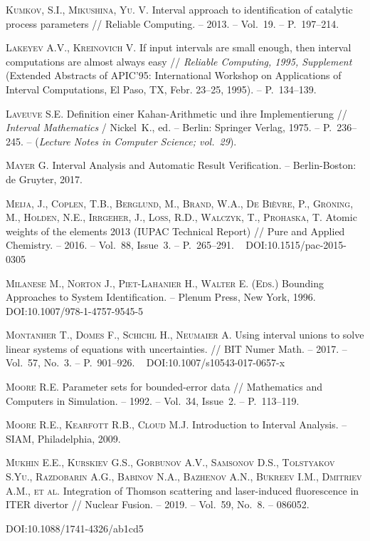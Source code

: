 \documentclass[a5paper,openany]{book}
\newcommand{\electronicbook}{}%
\newcommand{\doi}[1]{
    \ifdefined\electronicbook
        DOI:#1
    \fi}%
\begin{document}
\begin{thebibliography}{999}
\textsc{Kumkov, S.I., Mikushina, Yu. V.} Interval approach to identification 
of catalytic process parameters // Reliable Computing. -- 2013. -- Vol.~19. 
-- P.~197--214. 
  
\textsc{Lakeyev A.V., Kreinovich V.} If input intervals are small enough, then interval 
computations are almost always easy // \textsl{Reliable Computing, 1995, Supplement} 
(Extended Abstracts of APIC'95: International Workshop on Applications of Interval 
Computations, El Paso, TX, Febr. 23--25, 1995). -- P.~134--139. 
  
\textsc{Laveuve S.E.} Definition einer Kahan-Arithmetic und ihre Implementierung // 
\textsl{Interval Mathematics} / Nickel~K., ed. -- Berlin: Springer Verlag, 1975. -- 
P.~236--245. -- (\textsl{Lecture Notes in Computer Science; vol.~29}). 
  
\textsc{Mayer G.} Interval Analysis and Automatic Result Verification. -- Berlin-Boston: 
de Gruyter, 2017.  
  
\textsc{Meija, J., Coplen, T.B., Berglund, M., Brand, W.A., De Bièvre, P., 
Gröning, M., Holden, N.E., Irrgeher, J., Loss, R.D., Walczyk, T., Prohaska, T.} 
Atomic weights of the elements 2013 (IUPAC Technical Report) // Pure and Applied 
Chemistry. -- 2016. -- Vol.~88, Issue~3. -- P.~265--291. \   
\doi{10.1515/pac-2015-0305}  
  
\textsc{Milanese M., Norton J., Piet-Lahanier H., Walter E. (Eds.)} Bounding 
Approaches to System Identification. -- Plenum Press, New York, 1996. \   
\doi{10.1007/978-1-4757-9545-5} 

\textsc{Montanher T., Domes F., Schichl H., Neumaier A.} Using interval unions to solve 
linear systems of equations with uncertainties. // BIT Numer Math. -- 2017. -- Vol.~57, 
No.~3. -- P.~901--926. \     \doi{10.1007/s10543-017-0657-x} 
  
\bibitem{Moore1992} 
\textsc{Moore R.E.} Parameter sets for bounded-error data // Mathematics and Computers 
in Simulation. -- 1992. -- Vol.~34, Issue~2. -- P.~113--119. 
  
\bibitem{MooreBakerCloud} 
\textsc{Moore R.E., Kearfott R.B., Cloud M.J.} Introduction to Interval Analysis. 
-- SIAM, Philadelphia, 2009. 
 
\textsc{Mukhin E.E., Kurskiev G.S., Gorbunov A.V., Samsonov D.S., Tolstyakov S.Yu., 
Razdobarin A.G., Babinov N.A., Bazhenov A.N., Bukreev I.M., Dmitriev A.M., et al.} 
Integration of Thomson scattering and laser-induced fluorescence in ITER divertor // 
Nuclear Fusion. -- 2019. -- Vol.~59, No.~8. -- 086052. 
\doi{10.1088/1741-4326/ab1cd5}  
  

\end{thebibliography}
\end{document}
